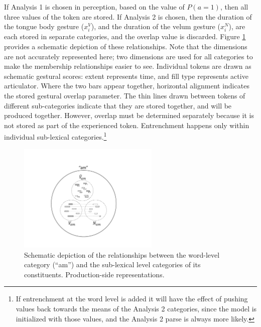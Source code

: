 If Analysis 1 is chosen in perception, based on the value of $P(a=1)$,
then all three values of the token are stored. If Analysis 2 is chosen,
then the duration of the tongue body gesture ($x_{i}^{V}$), and the
duration of the velum gesture ($x_{i}^{N}$), are each stored in separate
categories, and the overlap value is discarded. Figure \ref{fig:MultiParse-Reps}
provides a schematic depiction of these relationships. Note that the
dimensions are not accurately represented here; two dimensions are
used for all categories to make the membership relationships easier
to see. Individual tokens are drawn as schematic gestural scores:
extent represents time, and fill type represents active articulator.
Where the two bars appear together, horizontal alignment indicates the stored gestural overlap parameter. The thin
lines drawn between tokens of different sub-categories indicate that
they are stored together, and will be produced together. However, overlap must
be determined separately because it is not stored as part of the experienced token. Entrenchment happens only
within individual sub-lexical categories.\footnote{If entrenchment at the word level is added it will have the effect
of pushing values back towards the means of the Analysis 2 categories,
since the model is initialized with those values, and the Analysis 2
parse is always more likely.}

\begin{figure}[h]

\includegraphics[width=0.6\textwidth]{figures/MultiParseModel.pdf}\caption{\label{fig:MultiParse-Reps}Schematic depiction of the relationships
between the word-level category (“am”) and the sub-lexical level
categories of its constituents. Production-side representations.}

\end{figure}

